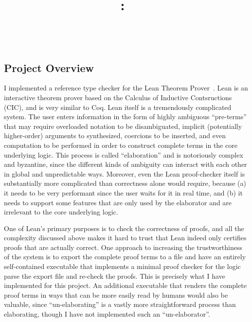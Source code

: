 \documentclass{article}
\title{\vspace{2in}\textmd{\textbf{\hmwkClass:\ \hmwkTitle}}\\\normalsize\vspace{0.1in}\\\vspace{0.1in}\vspace{3in}}
\date{}
\author{\textbf{\hmwkAuthorName}}
\begin{document}
\begin{spacing}{1.1}
\maketitle
\newpage


\clearpage
\section{Project Overview}

I implemented a reference type checker for the Lean Theorem Prover~\cite{de2015lean}. Lean is an interactive theorem prover based on the Calculus of Inductive Contsructions (CIC), and is very similar to Coq. Lean itself is a tremendously complicated system. The user enters information in the form of highly ambiguous ``pre-terms'' that may require overloaded notation to be disambiguated, implicit (potentially higher-order) arguments to synthesized, coercions to be inserted, and even computation to be performed in order to construct complete terms in the core underlying logic. This process is called ``elaboration'' and is notoriously complex and byzantine, since the different kinds of ambiguity can interact with each other in global and unpredictable ways. Moreover, even the Lean proof-checker itself is substantially more complicated than correctness alone would require, because (a) it needs to be very performant since the user waits for it in real time, and (b) it needs to support some features that are only used by the elaborator and are irrelevant to the core underlying logic.

One of Lean's primary purposes is to check the correctness of proofs, and all the complexity discussed above makes it hard to trust that Lean indeed only certifies proofs that are actually correct. One approach to increasing the trustworthiness of the system is to export the complete proof terms to a file and have an entirely self-contained executable that implements a minimal proof checker for the logic parse the export file and re-check the proofs. This is precisely what I have implemented for this project. An additional executable that renders the complete proof terms in ways that can be more easily read by humans would also be valuable, since ``un-elaborating'' is a vastly more straightforward process than elaborating, though I have not implemented such an ``un-elaborator''.


\end{spacing}
\end{document}
